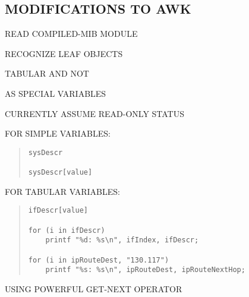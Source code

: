\begin{bwslide}
\part*	{MODIFICATIONS TO AWK}\bf

\begin{nrtc}
\item	READ COMPILED-MIB MODULE

\item	RECOGNIZE LEAF OBJECTS
    \begin{nrtc}
    \item	TABULAR AND NOT
    \end{nrtc}
	AS SPECIAL VARIABLES

\item	CURRENTLY ASSUME READ-ONLY STATUS
\end{nrtc}
\end{bwslide}


\begin{bwslide}

\begin{nrtc}
\item	FOR SIMPLE VARIABLES:
\begin{quote}\small\begin{verbatim}
sysDescr

sysDescr[value]
\end{verbatim}\end{quote}

\item	FOR TABULAR VARIABLES:
\begin{quote}\small\begin{verbatim}
ifDescr[value]

for (i in ifDescr)
    printf "%d: %s\n", ifIndex, ifDescr;

for (i in ipRouteDest, "130.117")
    printf "%s: %s\n", ipRouteDest, ipRouteNextHop;
\end{verbatim}\end{quote}
	USING POWERFUL GET-NEXT OPERATOR
\end{nrtc}
\end{bwslide}

